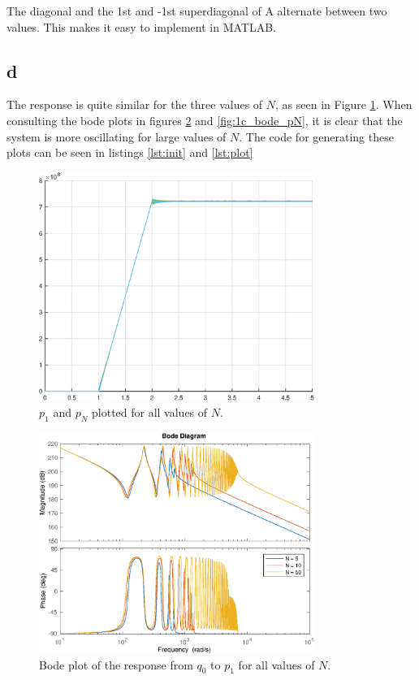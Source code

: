 \documentclass{article}
\begin{document}
The diagonal and the 1st and -1st superdiagonal of A alternate between two values. This makes it easy to implement in MATLAB. 

\subsection{d}

The response is quite similar for the three values of $N$, as seen in Figure \ref{fig:1c}. When consulting the bode plots in figures \ref{fig:1c_bode_p1} and \ref{fig:1c_bode_pN}, it is clear that the system is more oscillating for large values of $N$.
The code for generating these plots can be seen in listings \ref{lst:init} and \ref{lst:plot}

\begin{figure}[H]
    \centering
    \includegraphics[width = 0.8\textwidth]{ex7_1c}
    \caption{$p_1$ and $p_N$ plotted for all values of $N$.}
    \label{fig:1c}
\end{figure}

\begin{figure}[H]
    \centering
    \includegraphics[width = 0.8\textwidth]{ex7_1c_bode_p1}
    \caption{Bode plot of the response from $q_0$ to $p_1$ for all values of $N$.}
    \label{fig:1c_bode_p1}
\end{figure}
\end{document}
